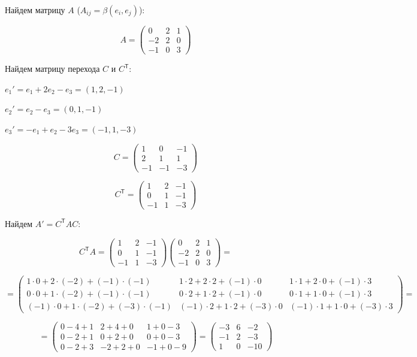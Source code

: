 \documentclass[12pt,final,oneside]{extreport}%
\begin{document}
Найдем матрицу $A$ ($A_{ij} = \beta(e_i, e_j)$):

\[
A = \begin{pmatrix}
0 & 2 & 1 \\
-2 & 2 & 0 \\
-1 & 0 & 3
\end{pmatrix}
\]

Найдем матрицу перехода $C$ и $C^{\mathsf{T}}$:

$e_1' = e_1 + 2e_2 - e_3 = (1,2,-1)$

$e_2' = e_2 - e_3 = (0,1,-1)$

$e_3' = -e_1 + e_2 - 3e_3 = (-1,1,-3)$

\[
C = \begin{pmatrix}
1 & 0 & -1 \\
2 & 1 & 1 \\
-1 & -1 & -3
\end{pmatrix}
\]

\[
C^{\mathsf{T}} = \begin{pmatrix}
1 & 2 & -1 \\
0 & 1 & -1 \\
-1 & 1 & -3
\end{pmatrix}
\]

Найдем \textbf{$A' = C^{\mathsf{T}} A C$}:

\[
C^{\mathsf{T}}A = 
\begin{pmatrix}
1 & 2 & -1 \\
0 & 1 & -1 \\
-1 & 1 & -3
\end{pmatrix}
\begin{pmatrix}
0 & 2 & 1 \\
-2 & 2 & 0 \\
-1 & 0 & 3
\end{pmatrix} =
\]

\[
= \begin{pmatrix}
1\cdot0 + 2\cdot(-2) + (-1)\cdot(-1) & 1\cdot2 + 2\cdot2 + (-1)\cdot0 & 1\cdot1 + 2\cdot0 + (-1)\cdot3 \\
0\cdot0 + 1\cdot(-2) + (-1)\cdot(-1) & 0\cdot2 + 1\cdot2 + (-1)\cdot0 & 0\cdot1 + 1\cdot0 + (-1)\cdot3 \\
(-1)\cdot0 + 1\cdot(-2) + (-3)\cdot(-1) & (-1)\cdot2 + 1\cdot2 + (-3)\cdot0 & (-1)\cdot1 + 1\cdot0 + (-3)\cdot3
\end{pmatrix} =
\]

\[
= \begin{pmatrix}
0 - 4 + 1 & 2 + 4 + 0 & 1 + 0 - 3 \\
0 - 2 + 1 & 0 + 2 + 0 & 0 + 0 - 3 \\
0 - 2 + 3 & -2 + 2 + 0 & -1 + 0 - 9
\end{pmatrix}
= \begin{pmatrix}
-3 & 6 & -2 \\
-1 & 2 & -3 \\
1 & 0 & -10
\end{pmatrix}
\]
\end{document}
